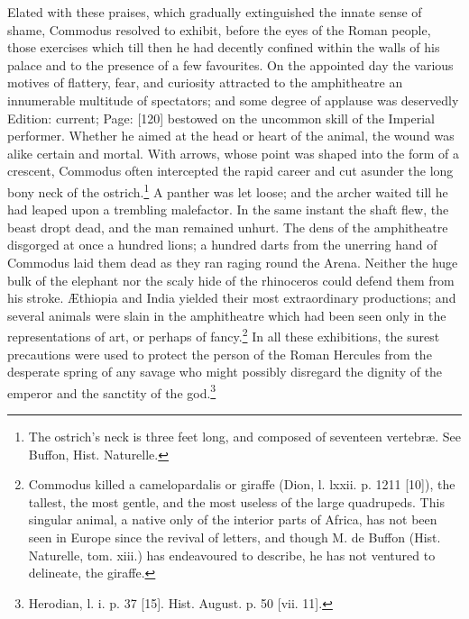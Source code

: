 Elated with these praises, which gradually extinguished the innate sense of shame, Commodus resolved to exhibit, before the eyes of the Roman people, those exercises which till then he had decently confined within the walls of his palace and to the presence of a few favourites. On the appointed day the various motives of flattery, fear, and curiosity attracted to the amphitheatre an innumerable multitude of spectators; and some degree of applause was deservedly Edition: current; Page: [120] bestowed on the uncommon skill of the Imperial performer. Whether he aimed at the head or heart of the animal, the wound was alike certain and mortal. With arrows, whose point was shaped into the form of a crescent, Commodus often intercepted the rapid career and cut asunder the long bony neck of the ostrich.\footnote{The ostrich\texthebrew{}’s neck is three feet long, and composed of seventeen vertebræ. See Buffon, Hist. Naturelle.} A panther was let loose; and the archer waited till he had leaped upon a trembling malefactor. In the same instant the shaft flew, the beast dropt dead, and the man remained unhurt. The dens of the amphitheatre disgorged at once a hundred lions; a hundred darts from the unerring hand of Commodus laid them dead as they ran raging round the Arena. Neither the huge bulk of the elephant nor the scaly hide of the rhinoceros could defend them from his stroke. Æthiopia and India yielded their most extraordinary productions; and several animals were slain in the amphitheatre which had been seen only in the representations of art, or perhaps of fancy.\footnote{Commodus killed a camelopardalis or giraffe (Dion, l. lxxii. p. 1211 [10]), the tallest, the most gentle, and the most useless of the large quadrupeds. This singular animal, a native only of the interior parts of Africa, has not been seen in Europe since the revival of letters, and though M. de Buffon (Hist. Naturelle, tom. xiii.) has endeavoured to describe, he has not ventured to delineate, the giraffe.} In all these exhibitions, the surest precautions were used to protect the person of the Roman Hercules from the desperate spring of any savage who might possibly disregard the dignity of the emperor and the sanctity of the god.\footnote{Herodian, l. i. p. 37 [15]. Hist. August. p. 50 [vii. 11].}

